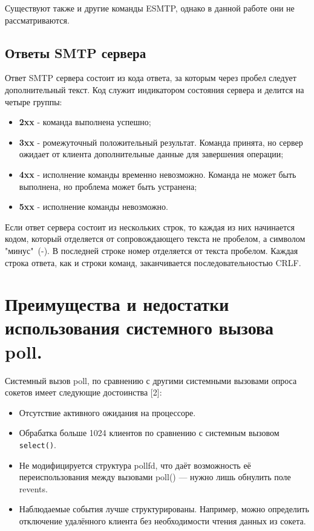 \documentclass[a4paper,12pt]{report}
\begin{document}
Существуют также и другие команды ESMTP, однако в данной работе они не рассматриваются. 

\subsection{Ответы SMTP сервера}

Ответ SMTP сервера состоит из кода ответа, за которым через пробел следует дополнительный текст. Код служит индикатором состояния сервера и делится на четыре группы:
\begin{itemize}
	\item \textbf{2xx} - команда выполнена успешно;
	\item \textbf{3xx} - ромежуточный положительный результат. Команда принята, но сервер ожидает от клиента дополнительные данные для завершения операции;
	\item \textbf{4xx} - исполнение команды временно невозможно. Команда не может быть выполнена, но проблема может быть устранена;
	\item \textbf{5xx} - исполнение команды невозможно.
\end{itemize}

Если ответ сервера состоит из нескольких строк, то каждая из них начинается кодом, который отделяется от сопровождающего текста не пробелом, а символом "минус"\ (-). В последней строке номер отделяется от текста пробелом. Каждая строка ответа, как и строки команд, заканчивается последовательностью CRLF.

\section{Преимущества и недостатки использования системного вызова poll.}

Системный вызов poll, по сравнению с другими системными вызовами опроса сокетов имеет следующие достоинства [2]: 
\begin{itemize}
	\item Отсутствие активного ожидания на процессоре.
	\item Обрабатка больше 1024 клиентов по сравнению с системным вызовом \texttt{select()}.
	\item Не модифицируется структура pollfd, что даёт возможность её переиспользования между вызовами poll() — нужно лишь обнулить поле revents.
	\item Наблюдаемые события лучше структурированы. Например, можно определить отключение удалённого клиента без необходимости чтения данных из сокета.
\end{itemize}
\end{document}
